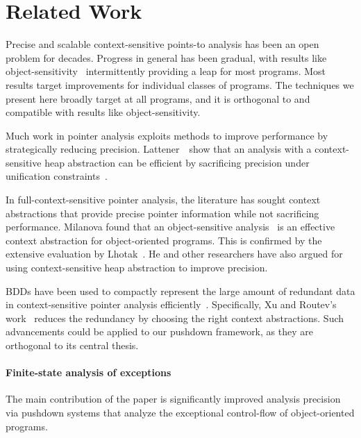\section{Related Work} \label{sec: related}

Precise and scalable context-sensitive points-to analysis 
has been an open problem for decades.
Progress in general has been gradual,
with results like object-sensitivity~\cite{local:Milanova:2007:LCP,local:Milanova:2005:parameterizedobject} intermittently providing a leap for most programs.
Most results target improvements for individual classes of programs.
The techniques we present here broadly target at all programs, and it is orthogonal to and compatible with
results like object-sensitivity.


Much work in pointer analysis exploits methods to improve performance
by strategically reducing precision. 
Lattener~\etal~show that an analysis with a context-sensitive
heap abstraction can be efficient by sacrificing precision 
under unification constraints~\cite{local:Lattner:2007:MCP}.


In full-context-sensitive pointer analysis, the literature has sought
 context abstractions that provide precise pointer information
while not sacrificing performance.
Milanova found that an object-sensitive analysis~\cite{local:Milanova:2005:parameterizedobject}
 is an effective context abstraction for object-oriented programs. 
 This is confirmed by the extensive evaluation by Lhotak~\cite{local:Lhotak:2008:EBC}.
He and other researchers have also argued for using context-sensitive heap abstraction 
to improve precision\cite{local:Nystrom:2004:IHS}.

BDDs have been used to compactly represent the large  amount of redundant  data in context-sensitive pointer analysis 
efficiently~\cite{local:Berndl:2003:PAU,Whaley:2004:CCP,local:Xu:2008:MEC}. 
Specifically, Xu and Routev's work~\cite{local:Xu:2008:MEC} reduces the redundancy by choosing the right context abstractions.
Such advancements could be applied to our pushdown framework, as they are orthogonal to its central thesis.


\paragraph{\textbf{Finite-state analysis of exceptions}}

The main contribution of the paper is significantly improved analysis precision
via pushdown systems that analyze the exceptional control-flow of object-oriented programs.

